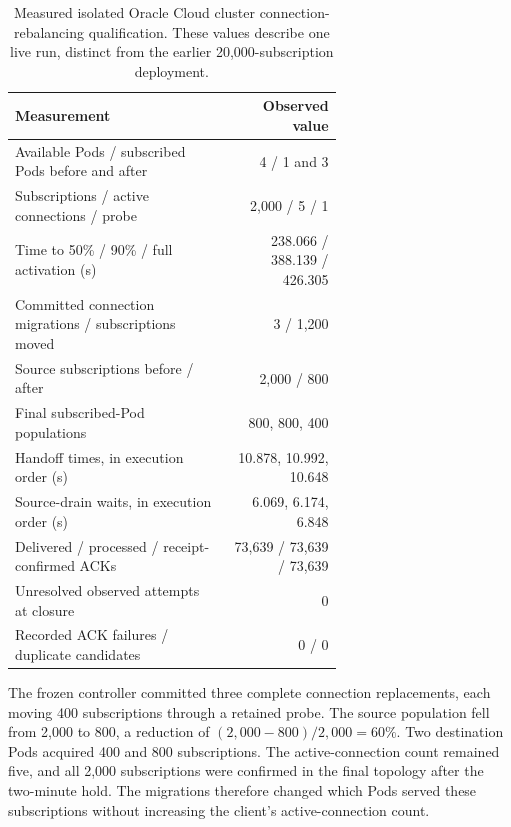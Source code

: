 \begin{table}[!htbp]
  \caption{Measured isolated Oracle Cloud cluster connection-rebalancing qualification.
  These values describe one live run, distinct from the earlier
  20,000-subscription deployment.}
  \label{tab:mumbai-isolated-recovery}
  \centering
  \small
  \begin{tabular}{p{0.65\linewidth}r}
    \toprule
    Measurement & Observed value \\
    \midrule
    Available Pods / subscribed Pods before and after & 4 / 1 and 3 \\
    Subscriptions / active connections / probe & 2,000 / 5 / 1 \\
    Time to 50\% / 90\% / full activation (s) & 238.066 / 388.139 / 426.305 \\
    Committed connection migrations / subscriptions moved & 3 / 1,200 \\
    Source subscriptions before / after & 2,000 / 800 \\
    Final subscribed-Pod populations & 800, 800, 400 \\
    Handoff times, in execution order (s) & 10.878, 10.992, 10.648 \\
    Source-drain waits, in execution order (s) & 6.069, 6.174, 6.848 \\
    Delivered / processed / receipt-confirmed ACKs & 73,639 / 73,639 / 73,639 \\
    Unresolved observed attempts at closure & 0 \\
    Recorded ACK failures / duplicate candidates & 0 / 0 \\
    \bottomrule
  \end{tabular}
\end{table}

The frozen controller committed three complete connection replacements,
each moving 400 subscriptions through a retained probe. The source population
fell from 2,000 to 800, a reduction of
$(2{,}000-800)/2{,}000=60\%$. Two destination Pods acquired 400 and 800
subscriptions. The active-connection count remained five, and all 2,000
subscriptions were confirmed in the final topology after the two-minute hold.
The migrations therefore changed which Pods served these subscriptions
without increasing the client's active-connection count.

